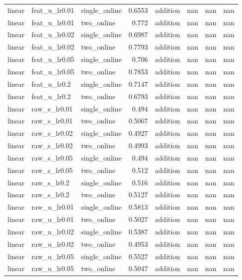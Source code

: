 \begin{table}[t]
\begin{tabular}{lllrrrrr}
linear & feat\_u\_lr0.01 & single\_online & 0.6553 & addition & nan & nan & nan \\
linear & feat\_u\_lr0.01 & two\_online & 0.772 & addition & nan & nan & nan \\
linear & feat\_u\_lr0.02 & single\_online & 0.6987 & addition & nan & nan & nan \\
linear & feat\_u\_lr0.02 & two\_online & 0.7793 & addition & nan & nan & nan \\
linear & feat\_u\_lr0.05 & single\_online & 0.706 & addition & nan & nan & nan \\
linear & feat\_u\_lr0.05 & two\_online & 0.7853 & addition & nan & nan & nan \\
linear & feat\_u\_lr0.2 & single\_online & 0.7147 & addition & nan & nan & nan \\
linear & feat\_u\_lr0.2 & two\_online & 0.6793 & addition & nan & nan & nan \\
linear & raw\_s\_lr0.01 & single\_online & 0.494 & addition & nan & nan & nan \\
linear & raw\_s\_lr0.01 & two\_online & 0.5067 & addition & nan & nan & nan \\
linear & raw\_s\_lr0.02 & single\_online & 0.4927 & addition & nan & nan & nan \\
linear & raw\_s\_lr0.02 & two\_online & 0.4993 & addition & nan & nan & nan \\
linear & raw\_s\_lr0.05 & single\_online & 0.494 & addition & nan & nan & nan \\
linear & raw\_s\_lr0.05 & two\_online & 0.512 & addition & nan & nan & nan \\
linear & raw\_s\_lr0.2 & single\_online & 0.516 & addition & nan & nan & nan \\
linear & raw\_s\_lr0.2 & two\_online & 0.5127 & addition & nan & nan & nan \\
linear & raw\_u\_lr0.01 & single\_online & 0.5813 & addition & nan & nan & nan \\
linear & raw\_u\_lr0.01 & two\_online & 0.5027 & addition & nan & nan & nan \\
linear & raw\_u\_lr0.02 & single\_online & 0.5387 & addition & nan & nan & nan \\
linear & raw\_u\_lr0.02 & two\_online & 0.4953 & addition & nan & nan & nan \\
linear & raw\_u\_lr0.05 & single\_online & 0.5527 & addition & nan & nan & nan \\
linear & raw\_u\_lr0.05 & two\_online & 0.5047 & addition & nan & nan & nan \\

\end{tabular}
\end{table}

